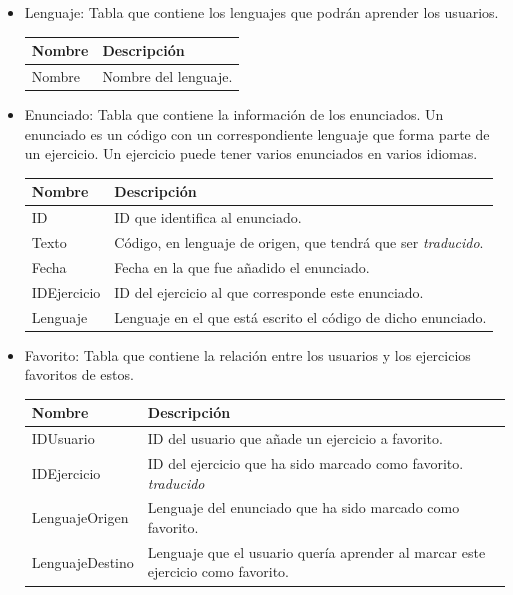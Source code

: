 \begin{itemize}
\item Lenguaje: Tabla que contiene los lenguajes que podrán aprender los usuarios.

\begin{tabularx}{14cm}{|l|X|}
\hline
\textbf{Nombre} & \textbf{Descripción}                                                              \\ \hline
Nombre       & Nombre del lenguaje. \\ \hline
\end{tabularx}
\vspace{1em}

\item Enunciado: Tabla que contiene la información de los enunciados. Un enunciado es un código con un correspondiente lenguaje que forma parte de un ejercicio. Un ejercicio puede tener varios enunciados en varios idiomas.

\begin{tabularx}{14cm}{|l|X|}
\hline
\textbf{Nombre} & \textbf{Descripción}                                                              \\ \hline
ID       & ID que identifica al enunciado. \\ \hline
Texto     & Código, en lenguaje de origen, que tendrá que ser \emph{traducido}.                                           \\ \hline
Fecha     & Fecha en la que fue añadido el enunciado.                                           \\ \hline
IDEjercicio     & ID del ejercicio al que corresponde este enunciado.                                           \\ \hline
Lenguaje     & Lenguaje en el que está escrito el código de dicho enunciado.                                           \\ \hline
\end{tabularx}
\vspace{1em}

\item Favorito: Tabla que contiene la relación entre los usuarios y los ejercicios favoritos de estos.

\begin{tabularx}{14cm}{|l|X|}
\hline
\textbf{Nombre} & \textbf{Descripción}                                                              \\ \hline
IDUsuario       & ID del usuario que añade un ejercicio a favorito. \\ \hline
IDEjercicio     & ID del ejercicio que ha sido marcado como favorito. \emph{traducido}                                           \\ \hline
LenguajeOrigen     & Lenguaje del enunciado que ha sido marcado como favorito.                                           \\ \hline
LenguajeDestino     & Lenguaje que el usuario quería aprender al marcar este ejercicio como favorito.                                           \\ \hline
\end{tabularx}
\vspace{1em}


\end{itemize}
